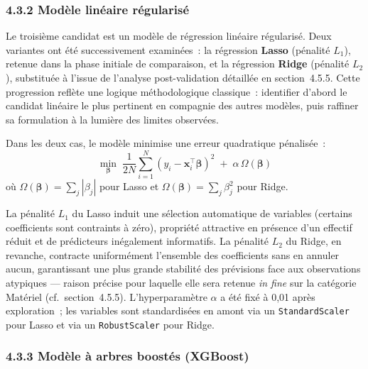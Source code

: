 \subsubsection*{4.3.2 \quad Mod\`ele lin\'eaire r\'egularis\'e}

Le troisi\`eme candidat est un mod\`ele de r\'egression lin\'eaire r\'egularis\'e. Deux
variantes ont \'et\'e successivement examin\'ees~: la r\'egression \textbf{Lasso}
(p\'enalit\'e $L_1$), retenue dans la phase initiale de comparaison, et la r\'egression
\textbf{Ridge} (p\'enalit\'e $L_2$), substitu\'ee \`a l'issue de l'analyse post-validation
d\'etaill\'ee en section~4.5.5. Cette progression refl\`ete une logique m\'ethodologique
classique~: identifier d'abord le candidat lin\'eaire le plus pertinent en compagnie
des autres mod\`eles, puis raffiner sa formulation \`a la lumi\`ere des limites observ\'ees.

Dans les deux cas, le mod\`ele minimise une erreur quadratique p\'enalis\'ee~:
$$
\min_{\boldsymbol\beta} \; \frac{1}{2N}\sum_{i=1}^{N}(y_i - \mathbf{x}_i^\top \boldsymbol\beta)^2
\;+\; \alpha\, \Omega(\boldsymbol\beta)
$$
o\`u $\Omega(\boldsymbol\beta) = \sum_j |\beta_j|$ pour Lasso et $\Omega(\boldsymbol\beta)
= \sum_j \beta_j^2$ pour Ridge.

\noindent
La p\'enalit\'e $L_1$ du Lasso induit une s\'election automatique de variables
(certains coefficients sont contraints \`a z\'ero), propri\'et\'e attractive en
pr\'esence d'un effectif r\'eduit et de pr\'edicteurs in\'egalement informatifs. La
p\'enalit\'e $L_2$ du Ridge, en revanche, contracte uniform\'ement l'ensemble des
coefficients sans en annuler aucun, garantissant une plus grande stabilit\'e des
pr\'evisions face aux observations atypiques --- raison pr\'ecise pour laquelle elle
sera retenue \textit{in fine} sur la cat\'egorie Mat\'eriel (cf.~section~4.5.5).
L'hyperparam\`etre $\alpha$ a \'et\'e fix\'e \`a 0{,}01 apr\`es exploration~; les
variables sont standardis\'ees en amont via un \texttt{StandardScaler} pour Lasso
et via un \texttt{RobustScaler} pour Ridge.

\subsubsection*{4.3.3 \quad Mod\`ele \`a arbres boost\'es (XGBoost)}

